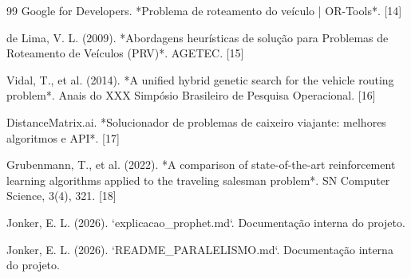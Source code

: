 \documentclass[11pt,a4paper,twocolumn]{article}
\begin{document}
\begin{thebibliography}{99}
Google for Developers. *Problema de roteamento do veículo | OR-Tools*. [14]

de Lima, V. L. (2009). *Abordagens heurísticas de solução para Problemas de Roteamento de Veículos (PRV)*. AGETEC. [15]

Vidal, T., et al. (2014). *A unified hybrid genetic search for the vehicle routing problem*. Anais do XXX Simpósio Brasileiro de Pesquisa Operacional. [16]

DistanceMatrix.ai. *Solucionador de problemas de caixeiro viajante: melhores algoritmos e API*. [17]

Grubenmann, T., et al. (2022). *A comparison of state-of-the-art reinforcement learning algorithms applied to the traveling salesman problem*. SN Computer Science, 3(4), 321. [18]

Jonker, E. L. (2026). `explicacao_prophet.md`. Documentação interna do projeto.

Jonker, E. L. (2026). `README_PARALELISMO.md`. Documentação interna do projeto.

\end{thebibliography}
\end{document}
